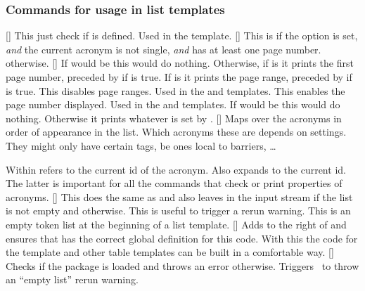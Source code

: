 \documentclass{acro-manual}
\begin{document}
\subsubsection{Commands for usage in list templates}
\begin{commands}
  \expandable{}[]
    This just check if  is defined.  Used in the 
    template.
  \expandable{}[]
    This is  if the option \code{/}
    is set, \emph{and} the current acronym is not single, \emph{and} has at
    least one page number.   otherwise.
  []
    If  would be  this would do nothing.
    Otherwise, if \code{/} is  it
    prints the first page number, preceded by  if
    \code{/} is true.  If
    \code{/} is  it prints the page
    range, preceded by  if \code{/} is
    true.
    This disables page ranges.  Used in the  and 
    templates.
    This enables the page number displayed.  Used in the
     and  templates. 
    If  would be  this would do
    nothing. Otherwise it prints whatever is set by
    \code{/}.
  []
    Maps over the acronyms in order of appearance in the list.  Which acronyms
    these are depends on settings.  They might only have certain tags, be ones
    local to barriers, \dots \par
    Within   refers to the current \ac{id} of the
    acronym.  Also  expands to the current \ac{id}.  The latter
    is important for all the commands that check or print properties of
    acronyms.
  []
    This does the same as  and also leaves  in the
    input stream if the list is not empty and  otherwise.  This is
    useful to trigger a rerun warning.
    This is an empty token list at the beginning of a list template.
  []
    Adds  to the right of  and ensures that
     has the correct global definition for this code.  With this
    the code for the  template and other table templates can
    be built in a comfortable way.
  []
    Checks if the package  is loaded and throws an error
    otherwise.
    Triggers \acro\ to throw an \enquote{empty list} rerun warning.
\end{commands}
\end{document}
